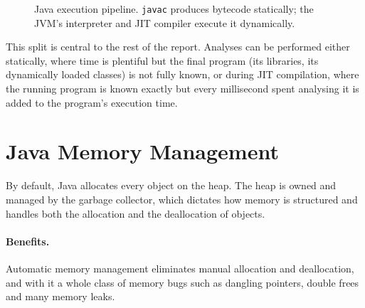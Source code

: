 \begin{figure}[htbp]
  \centering
  \caption{Java execution pipeline. \texttt{javac} produces bytecode statically; the JVM's
           interpreter and JIT compiler execute it dynamically.}
  \label{fig:pipeline}
\end{figure}

This split is central to the rest of the report. Analyses can be performed either statically,
where time is plentiful but the final program (its libraries, its dynamically loaded classes) is
not fully known, or during JIT compilation, where the running program is known exactly but every
millisecond spent analysing it is added to the program's execution time.

\section{Java Memory Management}

By default, Java allocates every object on the heap. The heap is owned and managed by the
garbage collector, which dictates how memory is structured and handles both the allocation and
the deallocation of objects.

\paragraph{Benefits.} Automatic memory management eliminates manual allocation and
deallocation, and with it a whole class of memory bugs such as dangling pointers, double frees
and many memory leaks.

